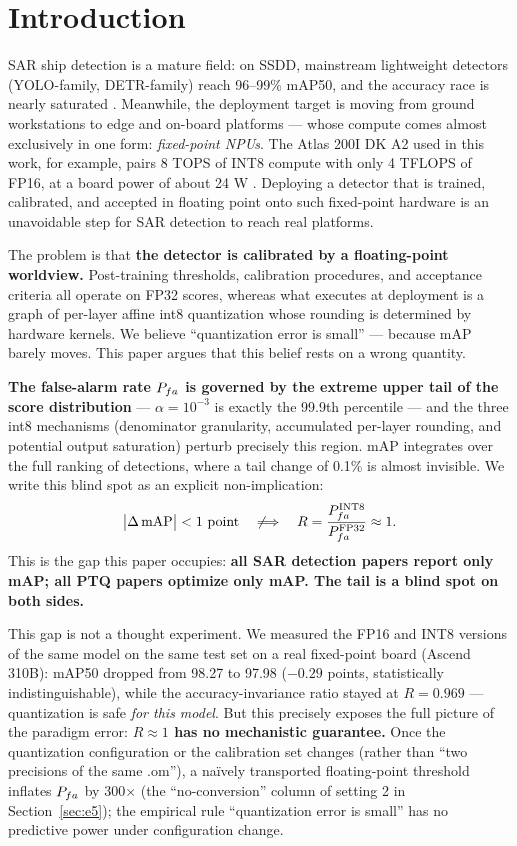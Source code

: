 \section{Introduction}
\label{sec:intro}

SAR ship detection is a mature field: on SSDD, mainstream lightweight detectors (YOLO-family, DETR-family) reach 96--99\% mAP50, and the accuracy race is nearly saturated \citep{ssdd,acyolo,beswyolo,lsddetr,lamfdet}.
Meanwhile, the deployment target is moving from ground workstations to edge and on-board platforms --- whose compute comes almost exclusively in one form: \emph{fixed-point NPUs}.
The Atlas 200I DK A2 used in this work, for example, pairs 8 TOPS of INT8 compute with only 4 TFLOPS of FP16, at a board power of about 24 W \citep{atlas_spec}.
Deploying a detector that is trained, calibrated, and accepted in floating point onto such fixed-point hardware is an unavoidable step for SAR detection to reach real platforms.

The problem is that \textbf{the detector is calibrated by a floating-point worldview.}
Post-training thresholds, calibration procedures, and acceptance criteria all operate on FP32 scores, whereas what executes at deployment is a graph of per-layer affine int8 quantization whose rounding is determined by hardware kernels.
We believe ``quantization error is small'' --- because mAP barely moves.
This paper argues that this belief rests on a wrong quantity.

\textbf{The false-alarm rate $P_{fa}$ is governed by the extreme upper tail of the score distribution} --- $\alpha=10^{-3}$ is exactly the 99.9th percentile --- and the three int8 mechanisms (denominator granularity, accumulated per-layer rounding, and potential output saturation) perturb precisely this region.
mAP integrates over the full ranking of detections, where a tail change of 0.1\% is almost invisible.
We write this blind spot as an explicit non-implication:
\begin{equation*}
\big|\Delta\,\mathrm{mAP}\big|<1\ \text{point}\quad\not\Longrightarrow\quad R=\frac{\Pfa^{\mathrm{INT8}}}{\Pfa^{\mathrm{FP32}}}\approx 1 .
\end{equation*}
This is the gap this paper occupies: \textbf{all SAR detection papers report only mAP; all PTQ papers optimize only mAP.
The tail is a blind spot on both sides.}

This gap is not a thought experiment.
We measured the FP16 and INT8 versions of the same model on the same test set on a real fixed-point board (Ascend 310B): mAP50 dropped from 98.27 to 97.98 ($-0.29$ points, statistically indistinguishable), while the accuracy-invariance ratio stayed at $R=0.969$ --- quantization is safe \emph{for this model}.
But this precisely exposes the full picture of the paradigm error: \textbf{$R\approx1$ has no mechanistic guarantee.}
Once the quantization configuration or the calibration set changes (rather than ``two precisions of the same .om''), a na\"ively transported floating-point threshold inflates $P_{fa}$ by 300$\times$ (the ``no-conversion'' column of setting 2 in Section~\ref{sec:e5}); the empirical rule ``quantization error is small'' has no predictive power under configuration change.

